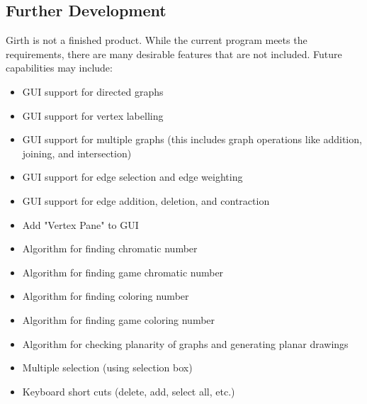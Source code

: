\documentclass{article}
\begin{document}
\subsection{Further Development}

Girth is not a finished product. While the current program meets the requirements,
there are many desirable features that are not included.
Future capabilities may include:
\begin{itemize}
  \item GUI support for directed graphs
  \item GUI support for vertex labelling
  \item GUI support for multiple graphs (this includes graph operations like addition, joining, and intersection)
  \item GUI support for edge selection and edge weighting
  \item GUI support for edge addition, deletion, and contraction
  \item Add "Vertex Pane" to GUI
  \item Algorithm for finding chromatic number
  \item Algorithm for finding game chromatic number
  \item Algorithm for finding coloring number
  \item Algorithm for finding game coloring number
  \item Algorithm for checking planarity of graphs and generating planar drawings
  \item Multiple selection (using selection box)
  \item Keyboard short cuts (delete, add, select all, etc.)
\end{itemize}
\end{document}
